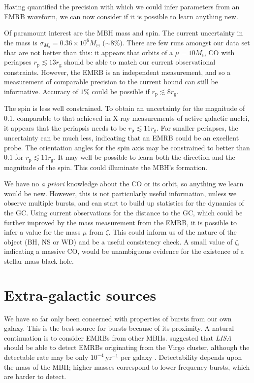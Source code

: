\documentclass[useAMS,usedcolumn,usegraphicx,usenatbib]{mn2e}
\newcommand{\units}[1]{\ensuremath{~\mathrm{#1}}}
\newcommand{\sub}[1]{\ensuremath{_\mathrm{#1}}}
\begin{document}
Having quantified the precision with which we could infer parameters from an EMRB waveform, we can now consider if it is possible to learn anything new.

Of paramount interest are the MBH mass and spin. The current uncertainty in the mass is $\sigma_{M_\bullet} = 0.36 \times 10^6 M_\odot$ ($\sim 8\%$). There are few runs amongst our data set that are not better than this: it appears that orbits of a $\mu = 10 M_\odot$ CO with periapses $r\sub{p} \lesssim 13 r\sub{g}$ should be able to match our current observational constraints. However, the EMRB is an independent measurement, and so a measurement of comparable precision to the current bound can still be informative. Accuracy of $1\%$ could be possible if $r\sub{p} \lesssim 8 r\sub{g}$.

The spin is less well constrained. To obtain an uncertainty for the magnitude of $0.1$, comparable to that achieved in X-ray measurements of active galactic nuclei, it appears that the periapsis needs to be $r\sub{p} \lesssim 11 r\sub{g}$. For smaller periapses, the uncertainty can be much less, indicating that an EMRB could be an excellent probe. The orientation angles for the spin axis may be constrained to better than $0.1$ for $r\sub{p} \lesssim 11 r\sub{g}$. It may well be possible to learn both the direction and the magnitude of the spin. This could illuminate the MBH's formation.

We have no {\it a priori} knowledge about the CO or its orbit, so anything we learn would be new. However, this is not particularly useful information, unless we observe multiple bursts, and can start to build up statistics for the dynamics of the GC. Using current observations for the distance to the GC, which could be further improved by the mass measurement from the EMRB, it is possible to infer a value for the mass $\mu$ from $\zeta$. This could inform us of the nature of the object (BH, NS or WD) and be a useful consistency check. A small value of $\zeta$, indicating a massive CO, would be unambiguous evidence for the existence of a stellar mass black hole.

\section{Extra-galactic sources}\label{sec:Extragal}

We have so far only been concerned with properties of bursts from our own galaxy. This is the best source for bursts because of its proximity. A natural continuation is to consider EMRBs from other MBHs. \citet{Rubbo2006} suggested that \textit{LISA} should be able to detect EMRBs originating from the Virgo cluster, although the detectable rate may be only $10^{-4}\units{yr^{-1}}$ per galaxy \citep{Hopman2007}. Detectability depends upon the mass of the MBH; higher masses correspond to lower frequency bursts, which are harder to detect.
\end{document}
